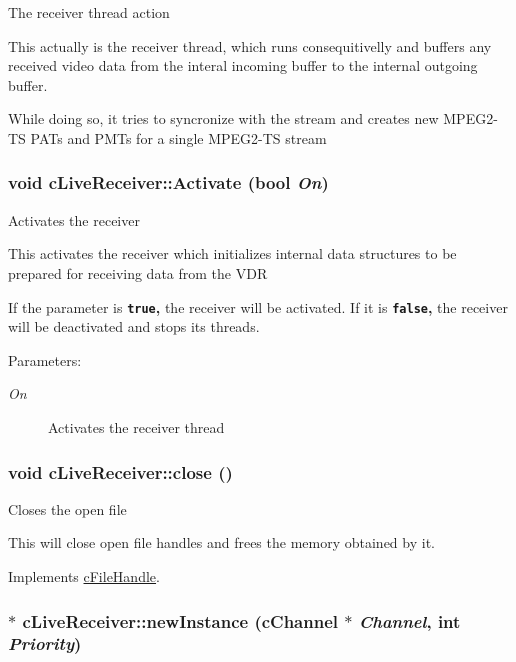 The receiver thread action

This actually is the receiver thread, which runs consequitivelly and buffers any received video data from the interal incoming buffer to the internal outgoing buffer.

While doing so, it tries to syncronize with the stream and creates new MPEG2-TS PATs and PMTs for a single MPEG2-TS stream \hypertarget{classcLiveReceiver_631c7392c3226b07ba654875580fb26c}{
\subsubsection[{Activate}]{\setlength{\rightskip}{0pt plus 5cm}void cLiveReceiver::Activate (bool {\em On})}}
\label{classcLiveReceiver_631c7392c3226b07ba654875580fb26c}


Activates the receiver

This activates the receiver which initializes internal data structures to be prepared for receiving data from the VDR

If the parameter is {\bf {\tt true},} the receiver will be activated. If it is {\bf {\tt false},} the receiver will be deactivated and stops its threads. \begin{Desc}
\item[Parameters:]
\begin{description}
\item[{\em On}]Activates the receiver thread \end{description}
\end{Desc}
\hypertarget{classcLiveReceiver_5b8beb2bc6809aacbdb087e31e836a27}{
\subsubsection[{close}]{\setlength{\rightskip}{0pt plus 5cm}void cLiveReceiver::close ()}}
\label{classcLiveReceiver_5b8beb2bc6809aacbdb087e31e836a27}


Closes the open file

This will close open file handles and frees the memory obtained by it.  

Implements \hyperlink{classcFileHandle_d7eaed7d254a64c85a48c3968238b93d}{cFileHandle}.\hypertarget{classcLiveReceiver_1e28c50bb73404597b2363422e038c12}{
\subsubsection[{newInstance}]{ $\ast$ cLiveReceiver::newInstance (cChannel $\ast$ {\em Channel}, \/  int {\em Priority})}}
\label{classcLiveReceiver_1e28c50bb73404597b2363422e038c12}


